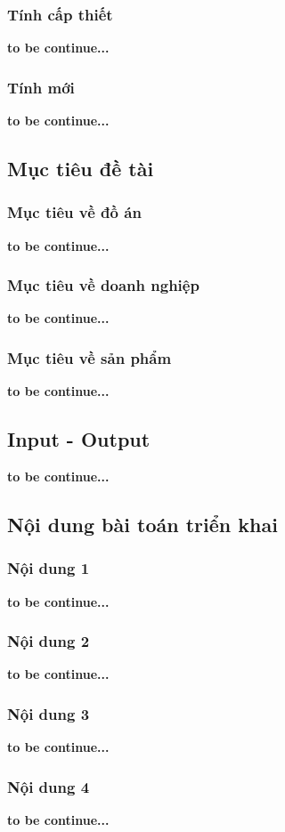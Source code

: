 \subsubsection{Tính cấp thiết}
\textbf{to be continue...}\\
\subsubsection{Tính mới}
\textbf{to be continue...}\\
\subsection{Mục tiêu đề tài}
\subsubsection{Mục tiêu về đồ án}
\textbf{to be continue...}\\
\subsubsection{Mục tiêu về doanh nghiệp}
\textbf{to be continue...}\\
\subsubsection{Mục tiêu về sản phẩm}
\textbf{to be continue...}\\
\subsection{Input - Output}
\textbf{to be continue...}\\
\subsection{Nội dung bài toán triển khai}
\subsubsection{Nội dung 1}
\textbf{to be continue...}\\
\subsubsection{Nội dung 2}
\textbf{to be continue...}\\
\subsubsection{Nội dung 3}
\textbf{to be continue...}\\
\subsubsection{Nội dung 4}
\textbf{to be continue...}\\
